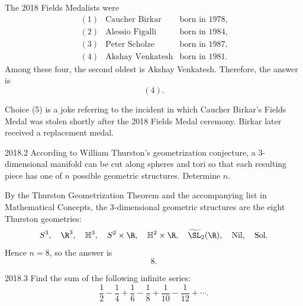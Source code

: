     \begin{solution}
        The 2018 Fields Medalists were
        \[
            \begin{array}{lll}
                (1) & \text{Caucher Birkar} & \text{born in 1978}, \\
                (2) & \text{Alessio Figalli} & \text{born in 1984}, \\
                (3) & \text{Peter Scholze} & \text{born in 1987}, \\
                (4) & \text{Akshay Venkatesh} & \text{born in 1981}.
            \end{array}
        \]
        Among these four, the second oldest is Akshay Venkatesh. Therefore, the answer is
        \[
            \boxed{(4)}.
        \]

        Choice (5) is a joke referring to the incident in which Caucher Birkar's Fields Medal was
        stolen shortly after the 2018 Fields Medal ceremony. Birkar later received a replacement
        medal.
    \end{solution}

    \begin{pastproblem}{2018.2}
        According to William Thurston's geometrization conjecture, a $3$-dimensional manifold can be
        cut along spheres and tori so that each resulting piece has one of $n$ possible geometric
        structures. Determine $n$.
    \end{pastproblem}

    \begin{solution}
        By the Thurston Geometrization Theorem and the accompanying list in
        Mathematical Concepts, the $3$-dimensional geometric structures are the
        eight Thurston geometries:
        \[
            S^3,\quad
            \R^3,\quad
            \mathbb{H}^3,\quad
            S^2 \times \R,\quad
            \mathbb{H}^2 \times \R,\quad
            \widetilde{\SL}_2(\R),\quad
            \mathrm{Nil},\quad
            \mathrm{Sol}.
        \]
        Hence $n=8$, so the answer is
        \[
            \boxed{8}.
        \]
    \end{solution}

    \begin{pastproblem}{2018.3}
        Find the sum of the following infinite series:
        \[
            \frac{1}{2}-\frac{1}{4}+\frac{1}{6}-\frac{1}{8}
            +\frac{1}{10}-\frac{1}{12}+\cdots.
        \]
    \end{pastproblem}

